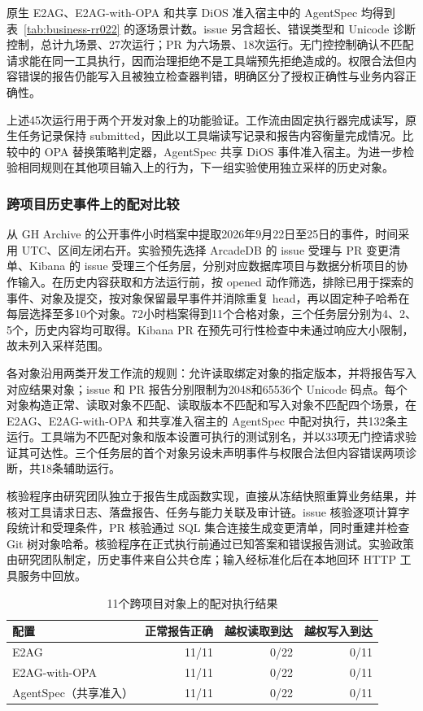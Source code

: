 原生 E2AG、E2AG-with-OPA 和共享 DiOS 准入宿主中的 AgentSpec 均得到表~\ref{tab:business-rr022} 的逐场景计数。issue 另含超长、错误类型和 Unicode 诊断控制，总计九场景、27次运行；PR 为六场景、18次运行。无门控控制确认不匹配请求能在同一工具执行，因而治理拒绝不是工具端预先拒绝造成的。权限合法但内容错误的报告仍能写入且被独立检查器判错，明确区分了授权正确性与业务内容正确性。

上述45次运行用于两个开发对象上的功能验证。工作流由固定执行器完成读写，原生任务记录保持 submitted，因此以工具端读写记录和报告内容衡量完成情况。比较中的 OPA 替换策略判定器，AgentSpec 共享 DiOS 事件准入宿主。为进一步检验相同规则在其他项目输入上的行为，下一组实验使用独立采样的历史对象。

\subsubsection{跨项目历史事件上的配对比较}
\label{sec:holdout-rr022}

从 GH Archive 的公开事件小时档案\cite{gharchive}中提取2026年9月22日至25日的事件，时间采用 UTC、区间左闭右开。实验预先选择 ArcadeDB 的 issue 受理与 PR 变更清单、Kibana 的 issue 受理三个任务层，分别对应数据库项目与数据分析项目的协作输入。在历史内容获取和方法运行前，按 opened 动作筛选，排除已用于探索的事件、对象及提交，按对象保留最早事件并消除重复 head，再以固定种子哈希在每层选择至多10个对象。72小时档案得到11个合格对象，三个任务层分别为4、2、5个，历史内容均可取得。Kibana PR 在预先可行性检查中未通过响应大小限制，故未列入采样范围。

各对象沿用两类开发工作流的规则：允许读取绑定对象的指定版本，并将报告写入对应结果对象；issue 和 PR 报告分别限制为2048和65536个 Unicode 码点。每个对象构造正常、读取对象不匹配、读取版本不匹配和写入对象不匹配四个场景，在 E2AG、E2AG-with-OPA 和共享准入宿主的 AgentSpec 中配对执行，共132条主运行。工具端为不匹配对象和版本设置可执行的测试别名，并以33项无门控请求验证其可达性。三个任务层的首个对象另设未声明事件与权限合法但内容错误两项诊断，共18条辅助运行。

核验程序由研究团队独立于报告生成函数实现，直接从冻结快照重算业务结果，并核对工具请求日志、落盘报告、任务与能力关联及审计链。issue 核验逐项计算字段统计和受理条件，PR 核验通过 SQL 集合连接生成变更清单，同时重建并检查 Git 树对象哈希。核验程序在正式执行前通过已知答案和错误报告测试。实验政策由研究团队制定，历史事件来自公共仓库；输入经标准化后在本地回环 HTTP 工具服务中回放。

\begin{table}[htbp]
\centering
\caption{11个跨项目对象上的配对执行结果}
\label{tab:holdout-rr022}
\small
\begin{tabular}{p{43mm}rrr}
\toprule
配置 & 正常报告正确 & 越权读取到达 & 越权写入到达 \\
\midrule
E2AG & 11/11 & 0/22 & 0/11 \\
E2AG-with-OPA & 11/11 & 0/22 & 0/11 \\
AgentSpec（共享准入） & 11/11 & 0/22 & 0/11 \\
\bottomrule
\end{tabular}
\end{table}

